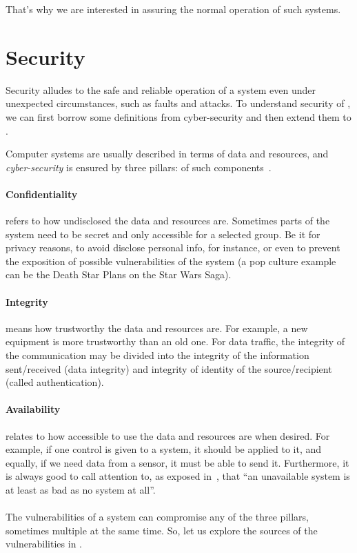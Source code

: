 \documentclass[../main.tex]{subfiles}
\begin{document}
That's why we are interested in assuring the normal operation of such systems.

\section{Security}\label{sec:security}
Security alludes to the safe and reliable operation of a system even under unexpected circumstances, such as faults and attacks.
To understand security of \cps{}, we can first borrow some definitions from cyber-security and then extend them to \cps{}.

Computer systems are usually described in terms of data and resources, and \emph{cyber-security} is ensured by three pillars: \CIA{} of such components~\cite{Bishop2005}.

\paragraph{Confidentiality} refers to how undisclosed the data and resources are.
Sometimes parts of the system need to be secret and only accessible for a selected group.
Be it for privacy reasons, to avoid disclose personal info, for instance, or even to prevent the exposition of possible vulnerabilities of the system (a pop culture example can be the Death Star Plans on the Star Wars Saga).

\paragraph{Integrity} means how trustworthy the data and resources are.
For example, a new equipment is more trustworthy than an old one. For data traffic, the integrity of the communication may be divided into the integrity of the information sent/received (data integrity) and integrity of identity of the source/recipient (called authentication).

\paragraph{Availability} relates to how accessible to use the data and resources are when desired.
For example, if one control is given to a system, it should be applied to it, and equally, if we need data from a sensor, it must be able to send it.
Furthermore, it is always good to call attention to, as exposed in~\cite{Bishop2005}, that ``an unavailable system is at least as bad as no system at all''.
\\~\\
The vulnerabilities of a system can compromise any of the three pillars, sometimes multiple at the same time. So, let us explore the sources of the vulnerabilities in \cps{}.
\end{document}
